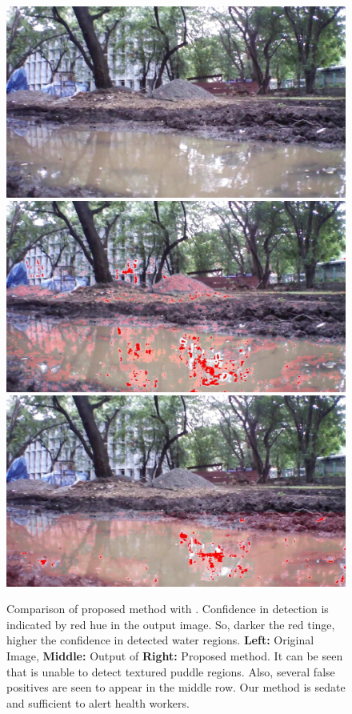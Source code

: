 \documentclass[11pt]{article}
\begin{document}
\begin{figure}
  \includegraphics[width=0.32\linewidth]{stagnantWater/results/dataset_63full/IMG_PAIR_102_1} \hfill
  \includegraphics[width=0.32\linewidth]{stagnantWater/results/dataset_63full/output_102_jpl2} \hfill
  \includegraphics[width=0.32\linewidth]{stagnantWater/results/dataset_63full/output_102}
  	
  \caption{Comparison of proposed method with \cite{rankin2004daytime}. Confidence in detection is indicated by red hue in the output image. 
So, darker the red tinge, higher the confidence in detected water regions. \textbf{Left:} Original Image,
    \textbf{Middle:} Output of \cite{rankin2004daytime} \textbf{Right:}
    Proposed method. It can be seen that \cite{rankin2004daytime} is unable to
    detect textured puddle regions. Also, several false positives are
    seen to appear in the middle row.  Our method is sedate and
    sufficient to alert health workers.}
\label{fig:comparison}
\end{figure}

\newpage


\end{document}
